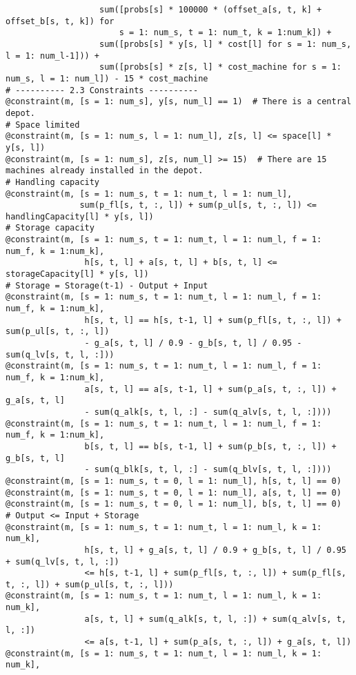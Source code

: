 \documentclass[fleqn,10pt]{wlscirep}
\begin{document}
\begin{lstlisting}
                   sum([probs[s] * 100000 * (offset_a[s, t, k] + offset_b[s, t, k]) for
                       s = 1: num_s, t = 1: num_t, k = 1:num_k]) +
                   sum([probs[s] * y[s, l] * cost[l] for s = 1: num_s, l = 1: num_l-1])) +
                   sum([probs[s] * z[s, l] * cost_machine for s = 1: num_s, l = 1: num_l]) - 15 * cost_machine
# ---------- 2.3 Constraints ----------
@constraint(m, [s = 1: num_s], y[s, num_l] == 1)  # There is a central depot.
# Space limited
@constraint(m, [s = 1: num_s, l = 1: num_l], z[s, l] <= space[l] * y[s, l])
@constraint(m, [s = 1: num_s], z[s, num_l] >= 15)  # There are 15 machines already installed in the depot.
# Handling capacity
@constraint(m, [s = 1: num_s, t = 1: num_t, l = 1: num_l],
               sum(p_fl[s, t, :, l]) + sum(p_ul[s, t, :, l]) <= handlingCapacity[l] * y[s, l])
# Storage capacity
@constraint(m, [s = 1: num_s, t = 1: num_t, l = 1: num_l, f = 1: num_f, k = 1:num_k],
                h[s, t, l] + a[s, t, l] + b[s, t, l] <= storageCapacity[l] * y[s, l])
# Storage = Storage(t-1) - Output + Input
@constraint(m, [s = 1: num_s, t = 1: num_t, l = 1: num_l, f = 1: num_f, k = 1:num_k],
                h[s, t, l] == h[s, t-1, l] + sum(p_fl[s, t, :, l]) + sum(p_ul[s, t, :, l])
                - g_a[s, t, l] / 0.9 - g_b[s, t, l] / 0.95 - sum(q_lv[s, t, l, :]))
@constraint(m, [s = 1: num_s, t = 1: num_t, l = 1: num_l, f = 1: num_f, k = 1:num_k],
                a[s, t, l] == a[s, t-1, l] + sum(p_a[s, t, :, l]) + g_a[s, t, l]
                - sum(q_alk[s, t, l, :] - sum(q_alv[s, t, l, :])))
@constraint(m, [s = 1: num_s, t = 1: num_t, l = 1: num_l, f = 1: num_f, k = 1:num_k],
                b[s, t, l] == b[s, t-1, l] + sum(p_b[s, t, :, l]) + g_b[s, t, l]
                - sum(q_blk[s, t, l, :] - sum(q_blv[s, t, l, :])))
@constraint(m, [s = 1: num_s, t = 0, l = 1: num_l], h[s, t, l] == 0)
@constraint(m, [s = 1: num_s, t = 0, l = 1: num_l], a[s, t, l] == 0)
@constraint(m, [s = 1: num_s, t = 0, l = 1: num_l], b[s, t, l] == 0)
# Output <= Input + Storage
@constraint(m, [s = 1: num_s, t = 1: num_t, l = 1: num_l, k = 1: num_k],
                h[s, t, l] + g_a[s, t, l] / 0.9 + g_b[s, t, l] / 0.95 + sum(q_lv[s, t, l, :])
                <= h[s, t-1, l] + sum(p_fl[s, t, :, l]) + sum(p_fl[s, t, :, l]) + sum(p_ul[s, t, :, l]))
@constraint(m, [s = 1: num_s, t = 1: num_t, l = 1: num_l, k = 1: num_k],
                a[s, t, l] + sum(q_alk[s, t, l, :]) + sum(q_alv[s, t, l, :])
                <= a[s, t-1, l] + sum(p_a[s, t, :, l]) + g_a[s, t, l])
@constraint(m, [s = 1: num_s, t = 1: num_t, l = 1: num_l, k = 1: num_k],

\end{lstlisting}
\end{document}
